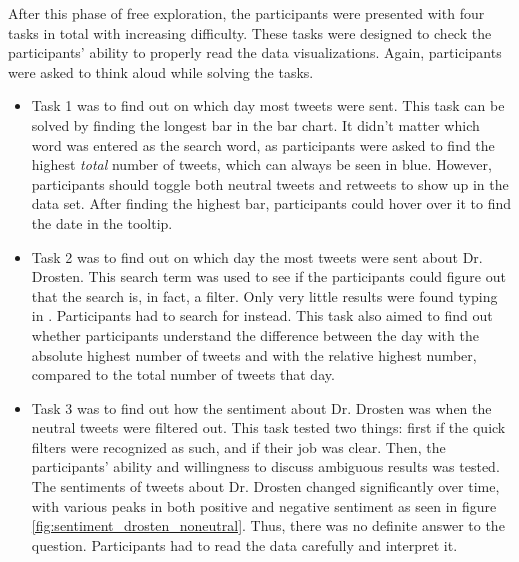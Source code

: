 After this phase of free exploration, the participants were presented with four tasks in total with increasing difficulty. These tasks were designed to check the participants' ability to properly read the data visualizations. Again, participants were asked to think aloud while solving the tasks.
\begin{itemize}
    \item Task 1 was to find out on which day most tweets were sent. This task can be solved by finding the longest bar in the bar chart. It didn't matter which word was entered as the search word, as participants were asked to find the highest \emph{total} number of tweets, which can always be seen in blue. However, participants should toggle both neutral tweets and retweets to show up in the data set. After finding the highest bar, participants could hover over it to find the date in the tooltip.
    \item Task 2 was to find out on which day the most tweets were sent about Dr. Drosten. This search term was used to see if the participants could figure out that the search is, in fact, a filter. Only very little results were found typing in . Participants had to search for  instead. This task also aimed to find out whether participants understand the difference between the day with the absolute highest number of tweets and with the relative highest number, compared to the total number of tweets that day.
    \item Task 3 was to find out how the sentiment about Dr. Drosten was when the neutral tweets were filtered out. This task tested two things: first if the quick filters were recognized as such, and if their job was clear. Then, the participants' ability and willingness to discuss ambiguous results was tested. The sentiments of tweets about Dr. Drosten changed significantly over time, with various peaks in both positive and negative sentiment as seen in figure \ref{fig:sentiment_drosten_noneutral}. Thus, there was no definite answer to the question. Participants had to read the data carefully and interpret it.
    \begin{figure}[h!tb]

\end{figure}
\end{itemize}
